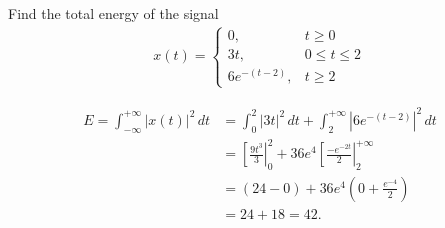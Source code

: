 \documentclass{report}
\begin{document}
\begin{example}
    Find the total energy of the signal 
    \begin{align*}
        x(t) = \begin{cases}
            0, & t\geq 0 \\
            3t, & 0\leq t\leq 2 \\
            6e^{-(t-2)}, & t\geq 2
        \end{cases}
    \end{align*}
\end{example}
\begin{solution}
    \begin{align*}
        E = \int_{-\infty}^{+\infty} |x(t)|^2 \,dt &= \int_{0}^{2} |3t|^2 \,dt + \int_{2}^{+\infty} |6e^{-(t-2)}|^2 \,dt \\
        &= \left[\frac{9t^3}{3}\right|_0^2 + 36e^4 \left[\frac{-e^{-2t}}{2}\right|_2^{+\infty} \\
        &= (24-0) + 36e^4\left(0+\frac{e^{-4}}{2}\right) \\
        &= 24 + 18 =  42.
    \end{align*}
\end{solution}
\end{document}
